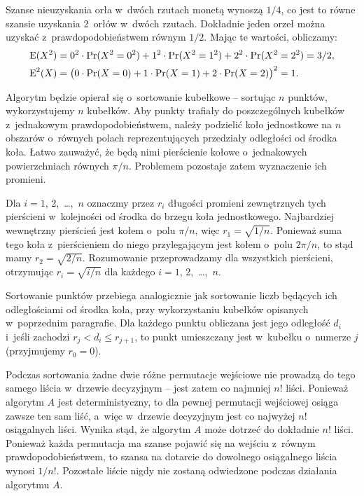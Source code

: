 \exercise %
Szanse nieuzyskania orła w~dwóch rzutach monetą wynoszą $1/4$, co jest to równe szansie uzyskania 2~orłów w~dwóch rzutach. Dokładnie jeden orzeł można uzyskać z~prawdopodobieństwem równym $1/2$. Mając te wartości, obliczamy:
\begin{align*}
	\operatorname{E}(X^2) &= 0^2\cdot\Pr(X^2=0^2)+1^2\cdot\Pr(X^2=1^2)+2^2\cdot\Pr(X^2=2^2) = 3/2, \\
	\operatorname{E}^2(X) &= \bigl(0\cdot\Pr(X=0)+1\cdot\Pr(X=1)+2\cdot\Pr(X=2)\bigr)^2 = 1.
\end{align*}

\exercise %
Algorytm będzie opierał się o~sortowanie kubełkowe -- sortując $n$ punktów, wykorzystujemy $n$ kubełków. Aby punkty trafiały do poszczególnych kubełków z~jednakowym prawdopodobieństwem, należy podzielić koło jednostkowe na $n$ obszarów o~równych polach reprezentujących przedziały odległości od środka koła. Łatwo zauważyć, że będą nimi pierścienie kołowe o~jednakowych powierzchniach równych $\pi/n$. Problemem pozostaje zatem wyznaczenie ich promieni.

Dla $i=1$, 2,~\dots,~$n$ oznaczmy przez $r_i$ długości promieni zewnętrznych tych pierścieni w~kolejności od środka do brzegu koła jednostkowego. Najbardziej wewnętrzny pierścień jest kołem o~polu $\pi/n$, więc $r_1=\sqrt{1/n}$. Ponieważ suma tego koła z~pierścieniem do niego przylegającym jest kołem o~polu $2\pi/n$, to stąd mamy $r_2=\sqrt{2/n}$. Rozumowanie przeprowadzamy dla wszystkich pierścieni, otrzymując $r_i=\sqrt{i/n}$ dla każdego $i=1$, 2,~\dots,~$n$.

Sortowanie punktów przebiega analogicznie jak sortowanie liczb będących ich odległościami od środka koła, przy wykorzystaniu kubełków opisanych w~poprzednim paragrafie. Dla każdego punktu obliczana jest jego odległość $d_i$ i~jeśli zachodzi $r_j<d_i\le r_{j+1}$, to punkt umieszczany jest w~kubełku o~numerze $j$ (przyjmujemy $r_0=0$).

\exercise %

\problems


\subproblem %
Podczas sortowania żadne dwie różne permutacje wejściowe nie prowadzą do tego samego liścia w~drzewie decyzyjnym -- jest zatem co najmniej $n!$ liści. Ponieważ algorytm $A$ jest deterministyczny, to dla pewnej permutacji wejściowej osiąga zawsze ten sam liść, a~więc w~drzewie decyzyjnym jest co najwyżej $n!$ osiągalnych liści. Wynika stąd, że algorytm $A$ może dotrzeć do dokładnie $n!$ liści. Ponieważ każda permutacja ma szanse pojawić się na wejściu z~równym prawdopodobieństwem, to szansa na dotarcie do dowolnego osiągalnego liścia wynosi $1/n!$. Pozostałe liście nigdy nie zostaną odwiedzone podczas działania algorytmu $A$.

